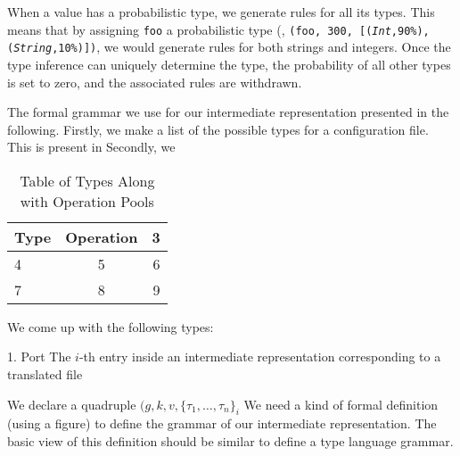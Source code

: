 When a value has a probabilistic type, we generate rules for all its types.
This means that by assigning {\texttt{foo}} a probabilistic type 
(\eg, {\tt (\texttt{foo}, 300, [(\textsl{Int},90\%), 
(\textsl{String},10\%)])},
we would generate rules for both strings and integers.
Once the type inference can uniquely determine the type, 
the probability of all other types is set to zero, 
and the associated rules are withdrawn.


The formal grammar we use for our intermediate representation presented in the following. 
Firstly, we make a list of the possible types for a configuration file. This is present in 
Secondly, we 

\begin{table}
  \begin{tabular}{| l | c | r |}
    \hline
    Type & Operation & 3 \\ \hline
    4 & 5 & 6 \\ \hline
    7 & 8 & 9 \\
    \hline
  \end{tabular}
\caption{Table of Types Along with Operation Pools}
\label{table:kysymys}
\end{table}

We come up with the following types:

1. Port 
The $i$-th entry inside an intermediate representation corresponding to a 
translated file 

We declare a quadruple $(g,k,v,\{\tau_1, \ldots, \tau_n\}_i$
We need a kind of formal definition (using a figure) to
define the grammar of our intermediate representation. The basic
view of this definition should be similar to define a type language
grammar.


